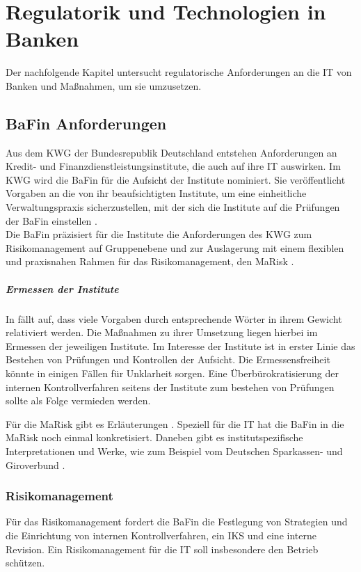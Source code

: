 \chapter{Regulatorik und Technologien in Banken}
\label{ch:background}
Der nachfolgende Kapitel untersucht regulatorische Anforderungen an die IT von Banken und Maßnahmen, um sie umzusetzen.
%

\section{BaFin Anforderungen}
Aus dem \ac{KWG} der Bundesrepublik Deutschland entstehen Anforderungen an Kredit- und Finanzdienstleistungsinstitute, die auch auf ihre IT auswirken. Im \ac{KWG} wird die BaFin für die Aufsicht der Institute nominiert. Sie veröffentlicht Vorgaben an die von ihr beaufsichtigten Institute, um eine einheitliche Verwaltungspraxis sicherzustellen, mit der sich die Institute auf die Prüfungen der BaFin einstellen \cite{BaFin:Verwaltungspraxis}. 
\medskip
\\
Die BaFin präzisiert für die Institute die Anforderungen des \ac{KWG} zum Risikomanagement auf Gruppenebene und zur Auslagerung mit einem flexiblen und praxisnahen Rahmen für das Risikomanagement, den \ac{MaRisk} \cite{MaRisk:2017}.

\paragraph{Ermessen der Institute}
In \cite{MaRisk:2017, BAIT:2018} fällt auf, dass viele Vorgaben durch entsprechende Wörter in ihrem Gewicht relativiert werden. Die Maßnahmen zu ihrer Umsetzung liegen hierbei im Ermessen der jeweiligen Institute. Im Interesse der Institute ist in erster Linie das Bestehen von Prüfungen und Kontrollen der Aufsicht. Die Ermessensfreiheit könnte in einigen Fällen für Unklarheit sorgen. Eine Überbürokratisierung der internen Kontrollverfahren seitens der Institute zum bestehen von Prüfungen sollte als Folge vermieden werden. 

Für die \ac{MaRisk} gibt es Erläuterungen \cite{MaRiskErläuterungen:2017}. Speziell für die IT hat die BaFin in \cite{BAIT:2018} die \ac{MaRisk} noch einmal konkretisiert. Daneben gibt es institutspezifische Interpretationen und Werke, wie zum Beispiel vom Deutschen Sparkassen- und Giroverbund \cite{DSGV:2019}.
%

\subsection{Risikomanagement}
Für das Risikomanagement fordert die \ac{BaFin} die Festlegung von Strategien und die Einrichtung von internen Kontrollverfahren, ein \ac{IKS} und eine interne Revision. Ein Risikomanagement für die IT soll insbesondere den Betrieb schützen. \cite{MaRisk:2017}

